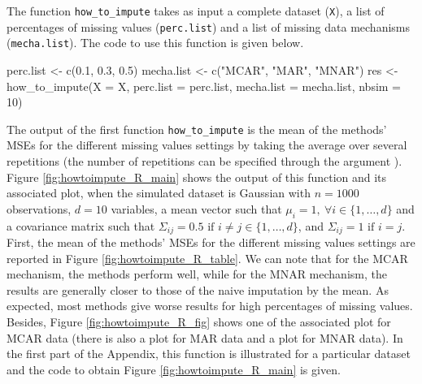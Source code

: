 The function \texttt{how\_to\_impute} takes as input a complete dataset (\texttt{X}), a list of percentages of missing values (\texttt{perc.list}) and a list of missing data mechanisms (\texttt{mecha.list}). The code to use this function is given below.
\begin{example}
perc.list <- c(0.1, 0.3, 0.5) 
mecha.list <- c("MCAR", "MAR", "MNAR") 
res <- how_to_impute(X = X, perc.list = perc.list, mecha.list = mecha.list, nbsim = 10) 
\end{example}
The output of the first function \texttt{how\_to\_impute} is the mean of the methods' MSEs for the different missing values settings by taking the average over several repetitions (the number of repetitions can be specified through the argument ). Figure \ref{fig:howtoimpute_R_main} shows the output of this function and its associated plot, when the simulated dataset is Gaussian with $n=1000$ observations, $d=10$ variables, a mean vector such that $\mu_i=1, \: \forall i \in \{1,\dots,d\}$ and a covariance matrix such that $\Sigma_{ij}=0.5 \textrm{ if } i\neq j \in \{1,\dots,d\}$, and $\Sigma_{ij}=1 \textrm{ if } i=j$. First, the mean of the methods' MSEs for the different missing values settings are reported in Figure \ref{fig:howtoimpute_R_table}. We can note that for the MCAR mechanism, the methods perform well, while for the MNAR mechanism, the results are generally closer to those of the naive imputation by the mean. As expected, most methods give worse results for high percentages of missing values. Besides, Figure \ref{fig:howtoimpute_R_fig} shows one of the associated plot for MCAR data (there is also a plot for MAR data and a plot for MNAR data). In the first part of the Appendix, this function is illustrated for a particular dataset and the code to obtain Figure \ref{fig:howtoimpute_R_main} is given. 



